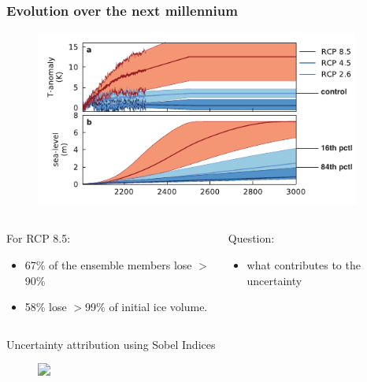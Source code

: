 \documentclass[hide notes,intlimits]{beamer}
\begin{document}
\begin{frame}
  \frametitle{Evolution over the next millennium}
  \begin{figure}
    \includegraphics[width=0.95\textwidth]{gris-les}
  \end{figure}
  \begin{columns}[c]
    \begin{column}{.6\linewidth}
  \small{
    For RCP 8.5:
  \begin{itemize}
  \item 67\% of the ensemble members lose $>$90\%
  \item 58\% lose $>$99\% of initial ice volume.
  \end{itemize}
  }
    \end{column}
    \begin{column}{.4\linewidth}
      \small{
        Question:
      \begin{itemize}
      \item what contributes to the uncertainty
      \end{itemize}
      }
    \end{column}
  \end{columns}
\end{frame}


\begin{frame}{Uncertainty attribution using Sobel Indices}
  \begin{figure}
    \includegraphics<1>[width=\textwidth]{sobel_ts}
  \end{figure}
\end{frame}
\end{document}
